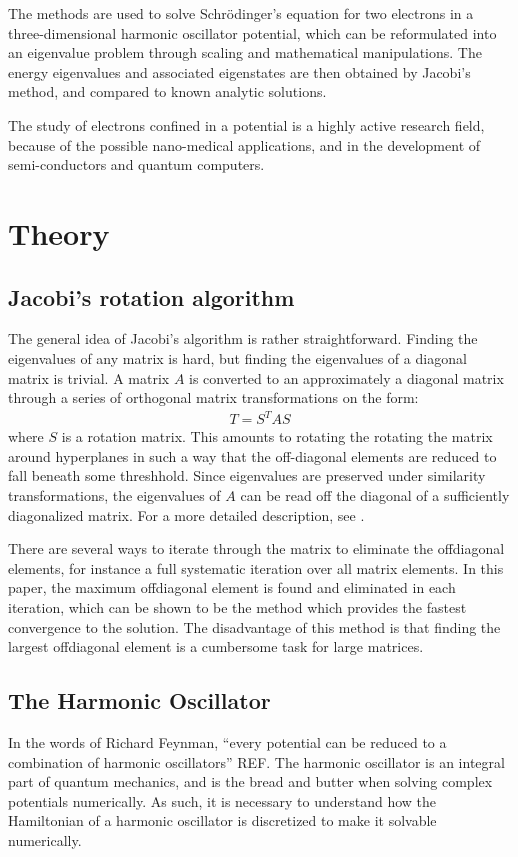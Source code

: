 \documentclass[aps,reprint]{revtex4-1}
\begin{document}
The methods are used to solve Schrödinger's equation for two electrons in a
three-dimensional harmonic oscillator potential, which can be reformulated into
an eigenvalue problem through scaling and mathematical manipulations. The
energy eigenvalues and associated eigenstates are then obtained by Jacobi's method,
and compared to known analytic solutions.

The study of electrons confined in a potential is a highly active research field,
because of the possible nano-medical applications, and in the development of semi-conductors
and quantum computers.
\section{Theory}
\label{sec:theory}
\subsection{Jacobi's rotation algorithm}
The general idea of Jacobi's algorithm is rather straightforward. Finding the
eigenvalues of any matrix is hard, but finding the eigenvalues of a diagonal
matrix is trivial. A matrix \(A\) is converted to an approximately a diagonal
matrix through a series of orthogonal matrix transformations on the form:
\begin{align*}
  T = S^T A S
\end{align*}
where $S$ is a rotation matrix. This amounts to rotating the rotating the matrix
around hyperplanes in such a way that the off-diagonal elements are reduced to
fall beneath some threshhold.
Since eigenvalues are preserved under similarity
transformations, the eigenvalues of \(A\) can be read off the diagonal of a
sufficiently diagonalized matrix. For a more detailed description, see \cite{mortenjensen}.

There are several ways to iterate through the matrix to eliminate the offdiagonal
elements, for instance a full systematic iteration over all matrix elements. In this paper,
the maximum offdiagonal element is found and eliminated in each iteration, which can be shown to be
the method which provides the fastest convergence to the solution. The disadvantage of this method
is that finding the largest offdiagonal element is a cumbersome task for large matrices.
\subsection{The Harmonic Oscillator}
\label{sec:harmonic}
In the words of Richard Feynman, ``every potential can be reduced to a
combination of harmonic oscillators'' REF. The harmonic oscillator is an
integral part of quantum mechanics, and is the bread and butter when solving
complex potentials numerically. As such, it is necessary to understand how the
Hamiltonian of a harmonic oscillator is discretized to make it solvable
numerically.
\end{document}
